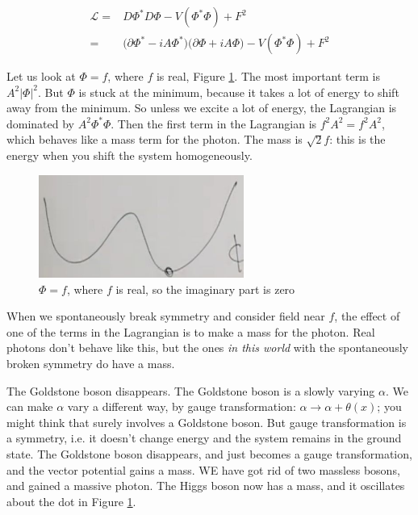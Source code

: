 \documentclass[]{article}
\begin{document}
\begin{align*}
	\mathcal{L} =& D\Phi^* D\Phi -V(\Phi^*\Phi) +F^2\\
	=& \big(\partial \Phi^* - i A \Phi^*\big) \big(\partial \Phi + i A \Phi\big) -V(\Phi^*\Phi) +F^2
\end{align*}

Let us look at $\Phi = f$, where $f$ is real, Figure \ref{fig:2-8-phi-f}. The most important term is $A^2 \lvert \Phi \rvert^2$. But $\Phi$ is stuck at the minimum, because it takes a lot of energy to shift away from the minimum. So unless we excite a lot of energy, the Lagrangian is dominated by $A^2 \Phi^*\Phi$. Then the first term in the Lagrangian is $f^2A^2=f^2A^2$, which behaves like a mass term for the photon. The mass is $\sqrt{2}f$: this is the energy when you shift the system homogeneously.
\begin{figure}[H]
	\begin{center}
		\caption[$\Phi = f$, where $f$ is real]{$\Phi = f$, where $f$ is real, so the imaginary part is zero}\label{fig:2-8-phi-f}
		\includegraphics[width=0.6\textwidth]{2-8-phi-f}
	\end{center}
\end{figure}

When we spontaneously break symmetry and consider field near $f$, the effect of one of the terms in the Lagrangian is to make a mass for the photon. Real photons don't behave like this, but the ones \emph{in this world} with the spontaneously broken symmetry do have a mass.

The Goldstone boson disappears. The Goldstone boson is a slowly varying $\alpha$. We can make $\alpha$ vary a different way, by gauge transformation: $\alpha\rightarrow\alpha+\theta(x)$; you might think that surely involves a Goldstone boson. But gauge transformation is a symmetry, i.e. it doesn't change energy and the system remains in the ground state. The Goldstone boson disappears, and just becomes a gauge transformation, and the vector potential gains a mass. WE have got rid of two massless bosons, and gained a massive photon. The Higgs boson now has a mass, and it oscillates about the dot in Figure \ref{fig:2-8-phi-f}.
\end{document}
